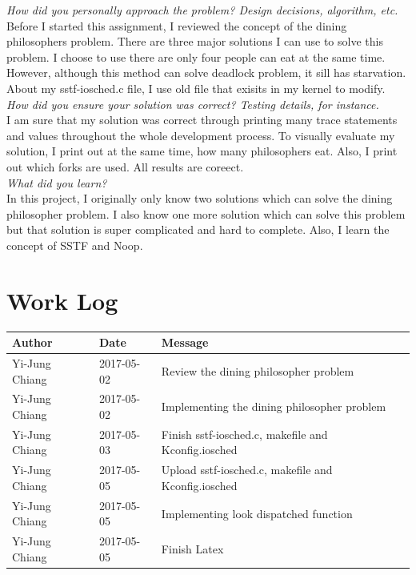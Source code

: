 \documentclass[10pt,conference,draftclsnofoot,onecolumn]{IEEEtran}
\begin{document}
\textit{How did you personally approach the problem? Design decisions, algorithm, etc.}\\

Before I started this assignment, I reviewed the concept of the dining philosophers problem. There are three major solutions I can use to solve this problem. I choose to use there are only four people can eat at the same time. However, although this method can solve deadlock problem, it sill has starvation. About my sstf-iosched.c file, I use old file that exisits in my kernel to modify.  \\



\textit{How did you ensure your solution was correct? Testing details, for instance.}\\

I am sure that my solution was correct through printing many trace statements and values throughout the whole development process. To visually evaluate my solution, I print out at the same time, how many philosophers eat. Also, I print out which forks are used. All results are coreect. \\

\textit{What did you learn?}\\

In this project, I originally only know two solutions which can solve the dining philosopher problem. I also know one more solution which can solve this problem but that solution is super complicated and hard to complete. Also, I learn the concept of SSTF and Noop.  \\





\section{Work Log}
\begin{tabular}{lll} \textbf{Author}
     & \textbf{Date}
     & \textbf{Message}

\\ \hline
Yi-Jung Chiang & 2017-05-02 & Review the dining philosopher problem\\ \hline
Yi-Jung Chiang & 2017-05-02 & Implementing the dining philosopher problem \\ \hline
Yi-Jung Chiang & 2017-05-03 & Finish sstf-iosched.c, makefile and Kconfig.iosched\\ \hline
Yi-Jung Chiang & 2017-05-05 & Upload sstf-iosched.c, makefile and Kconfig.iosched\\ \hline
Yi-Jung Chiang & 2017-05-05 & Implementing look dispatched function \\ \hline
Yi-Jung Chiang & 2017-05-05 & Finish Latex\\ \hline
\end{tabular}
\end{document}
